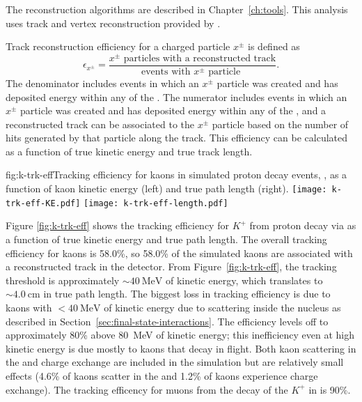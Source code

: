 The  reconstruction algorithms are described in Chapter~\ref{ch:tools}.  This analysis uses \threed track and vertex reconstruction provided by .

Track reconstruction efficiency for a charged particle $x^{\pm}$ is defined as 
\begin{equation}
\epsilon_{x^{\pm}} = \frac{\mbox{$x^{\pm}$ particles with a reconstructed track}}{\mbox{events with $x^{\pm}$ particle }}.
\end{equation}
The denominator includes events in which an $x^{\pm}$ particle was created and has deposited energy within any of the .  The numerator includes events in which an $x^{\pm}$ particle was created and has deposited energy within any of the , and a reconstructed track can be associated to the $x^{\pm}$ particle based on the number of hits generated by that particle along the track. This efficiency can be calculated as a function of true kinetic energy and true track length.

\begin{dunefigure}{fig:k-trk-eff}{Tracking efficiency for kaons in simulated proton decay events, \ptoknubar, as a function of kaon kinetic energy (left) and true path length (right).}
\texttt{[image: k-trk-eff-KE.pdf]}
\texttt{[image: k-trk-eff-length.pdf]}
\end{dunefigure}

Figure \ref{fig:k-trk-eff} shows the tracking efficiency for $K^{+}$  from proton decay via \ptoknubar as a function of true kinetic energy and true path length. The overall tracking efficiency for kaons is \num{58.0}\%, so \num{58.0}\% of the simulated kaons are associated with a reconstructed track in the detector.  From Figure~\ref{fig:k-trk-eff}, the tracking threshold is approximately $\sim\SI{40}{\MeV}$ of kinetic energy, which translates to $\sim\SI{4.0}{\cm}$ in true path length.  The biggest loss in tracking efficiency is due to kaons with $<\SI{40}{\MeV}$ of kinetic energy due to scattering inside the nucleus as described in Section~\ref{sec:final-state-interactions}.  The efficiency levels off to approximately \num{80}\% above \SI{80}{\MeV} of kinetic energy; this inefficiency even at high kinetic energy is due mostly to kaons that decay in flight.
Both kaon scattering in the  and charge exchange are included in the simulation but are relatively small effects (\num{4.6}\% of kaons scatter in the  and \num{1.2}\% of kaons experience charge exchange).   The tracking efficency for muons from the decay of the $K^{+}$ in \ptoknubar is \num{90}\%.

